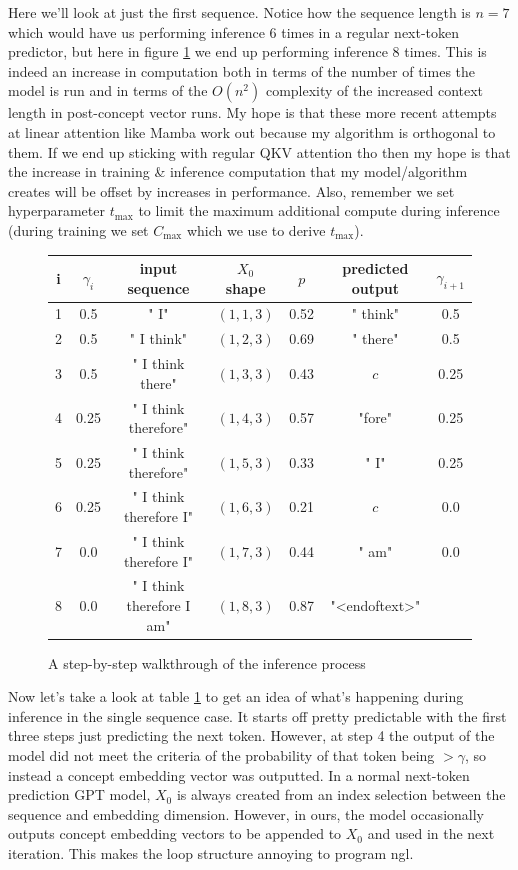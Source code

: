 \documentclass{article}
\begin{document}
Here we'll look at just the first sequence.
Notice how the sequence length is $n=7$ which would have us performing inference 6 times in a regular next-token predictor, but here in figure \ref{tab:inf} we end up performing inference 8 times.
This is indeed an increase in computation both in terms of the number of times the model is run and in terms of the $O(n^2)$ complexity of the increased context length in post-concept vector runs.
My hope is that these more recent attempts at linear attention like Mamba work out because my algorithm is orthogonal to them.
If we end up sticking with regular QKV attention tho then my hope is that the increase in training \& inference computation that my model/algorithm creates will be offset by increases in performance. 
Also, remember we set hyperparameter $t_\text{max}$ to limit the maximum additional compute during inference (during training we set $C_\text{max}$ which we use to derive $t_\text{max}$). \par

\begin{figure}[!htb]
    \centering
    \begin{tabular}{|c|c|c|c|c|c|c|}
    i & $\gamma_i$ & input sequence & $X_0$ shape & $p$ & predicted output & $\gamma_{i+1}$\\
    \hline
    1 & 0.5 & " I" & $(1,1,3)$ & 0.52 & " think" & 0.5\\
    2 & 0.5 & " I think" & $(1,2,3)$ & 0.69 & " there" & 0.5\\
    3 & 0.5 & " I think there" & $(1,3,3)$ & 0.43 & $c$ & 0.25\\
    4 & 0.25 & " I think therefore" & $(1,4,3)$ & 0.57 & "fore" & 0.25\\
    5 & 0.25 & " I think therefore" & $(1,5,3)$ & 0.33 & " I" & 0.25\\
    6 & 0.25 & " I think therefore I" & $(1,6,3)$ & 0.21 & $c$ & 0.0\\
    7 & 0.0 & " I think therefore I" & $(1,7,3)$ & 0.44 & " am" & 0.0\\
    8 & 0.0 & " I think therefore I am" & $(1,8,3)$ & 0.87 & "<endoftext>" & \\
\end{tabular}
    \caption{A step-by-step walkthrough of the inference process}
    \label{tab:inf}
\end{figure}

Now let's take a look at table \ref{tab:inf} to get an idea of what's happening during inference in the single sequence case.
It starts off pretty predictable with the first three steps just predicting the next token.
However, at step 4 the output of the model did not meet the criteria of the probability of that token being $>\gamma$, so instead a concept embedding vector was outputted. 
In a normal next-token prediction GPT model, $X_0$ is always created from an index selection between the sequence and embedding dimension.
However, in ours, the model occasionally outputs concept embedding vectors to be appended to $X_0$ and used in the next iteration. 
This makes the loop structure annoying to program ngl.\par
\end{document}

